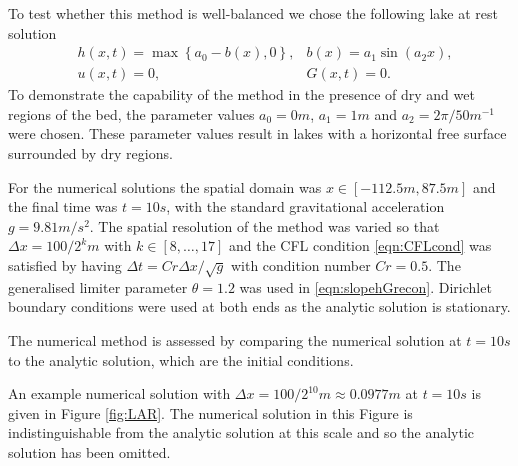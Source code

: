 \documentclass[times]{elsarticle}
\begin{document}
To test whether this method is well-balanced we chose the following lake at rest solution
	\begin{align*}
	&h(x,t) = \max\left\lbrace a_0 - b(x), 0 \right\rbrace, & b(x) = a_1 \sin\left(a_2 x\right), \\
	&u(x,t) = 0 , 	&G(x,t) = 0.
	\end{align*}
To demonstrate the capability of the method in the presence of dry and wet regions of the bed, the parameter values $a_0 = 0m$, $a_1 = 1m$ and $a_2 = 2 \pi / 50 m^{-1} $ were chosen. These parameter values result in lakes with a horizontal free surface surrounded by dry regions.

For the numerical solutions the spatial domain was $x \in \left[-112.5 m,87.5 m\right]$ and the final time was $t=10s$, with the standard gravitational acceleration $g= 9.81 m/s^2$. The spatial resolution of the method was varied so that $\Delta x = 100 / 2^k m$ with $k \in \left[8, \dots ,17\right]$ and the CFL condition \eqref{eqn:CFLcond} was satisfied by having $\Delta t = Cr \Delta x / \sqrt{g}$ with condition number $Cr = 0.5$. The generalised limiter parameter $\theta = 1.2$ was used in \eqref{eqn:slopehGrecon}. Dirichlet boundary conditions were used at both ends as the analytic solution is stationary.

The numerical method is assessed by comparing the numerical solution at $t=10s$ to the analytic solution, which are the initial conditions.

An example numerical solution with $\Delta x = 100/2^{10}m \approx 0.0977m$ at $t=10s$ is given in Figure \ref{fig:LAR}. The numerical solution in this Figure is indistinguishable from the analytic solution at this scale and so the analytic solution has been omitted. 
\end{document}
